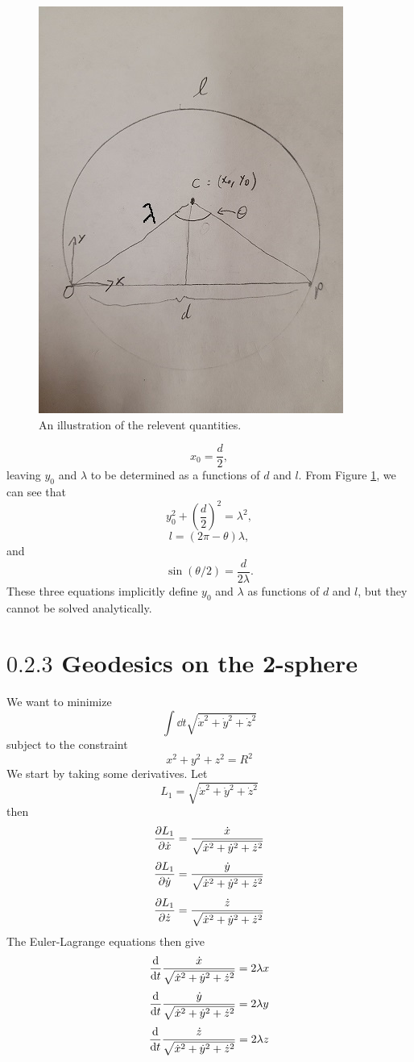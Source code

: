 \documentclass[12pt]{article}
\begin{document}
\begin{figure}[H]
    \includegraphics[scale=0.7]{fig1}
    \centering
    \caption{An illustration of the relevent quantities.}
    \label{fig1}
\end{figure}
\[ x_0 = \frac{d}{2}, \]
leaving $y_0$ and $\lambda$ to be determined as a functions of $d$ and $l$. From Figure \ref{fig1}, we can see that
\[ y_0^2 + \left(\frac{d}{2}\right)^2 = \lambda^2, \]
\[ l = (2\pi - \theta)\lambda, \]
and
\[ \sin(\theta/2) = \frac{d}{2\lambda}. \]
These three equations implicitly define $y_0$ and $\lambda$ as functions of $d$ and $l$, but they cannot be solved analytically.



\section*{$0.2.3$ Geodesics on the 2-sphere}
We want to minimize 
\[ \int \dd t \sqrt{\dot{x}^2 + \dot{y}^2 + \dot{z}^2} \]
subject to the constraint
\[ x^2 + y^2 + z^2 = R^2 \]
We start by taking some derivatives. Let 
\[ L_1 = \sqrt{\dot{x}^2 + \dot{y}^2 + \dot{z}^2} \]
then
\[ \pdv{L_1}{\dot{x}} = \frac{\dot{x}}{\sqrt{\dot{x}^2 + \dot{y}^2 + \dot{z}^2}} \]
\[ \pdv{L_1}{\dot{y}} = \frac{\dot{y}}{\sqrt{\dot{x}^2 + \dot{y}^2 + \dot{z}^2}} \]
\[ \pdv{L_1}{\dot{z}} = \frac{\dot{z}}{\sqrt{\dot{x}^2 + \dot{y}^2 + \dot{z}^2}} \]
The Euler-Lagrange equations then give
\[ \dv{t}\frac{\dot{x}}{\sqrt{\dot{x}^2 + \dot{y}^2 + \dot{z}^2}} = 2\lambda x \]
\[ \dv{t}\frac{\dot{y}}{\sqrt{\dot{x}^2 + \dot{y}^2 + \dot{z}^2}} = 2\lambda y \]
\[ \dv{t}\frac{\dot{z}}{\sqrt{\dot{x}^2 + \dot{y}^2 + \dot{z}^2}} = 2\lambda z \]
\end{document}
